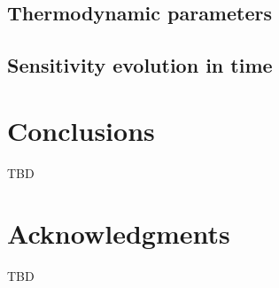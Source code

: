 \documentclass[preprint,review,12pt]{elsarticle}
\begin{document}
\subsection{Thermodynamic parameters}

\subsection{Sensitivity evolution in time}


\section{Conclusions}
\label{Conclusions}

TBD

\section*{Acknowledgments}
\label{Acknowledgments}

TBD 



\end{document}

